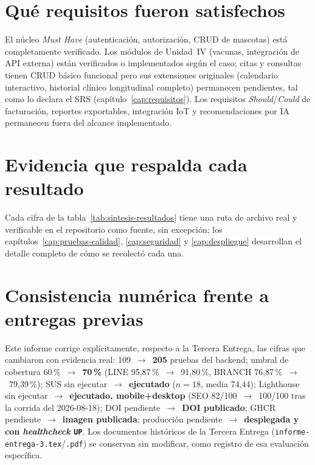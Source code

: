 \section{Qu\'e requisitos fueron satisfechos}

El n\'ucleo \emph{Must Have} (autenticaci\'on, autorizaci\'on, CRUD de
mascotas) est\'a completamente verificado. Los m\'odulos de Unidad~IV
(vacunas, integraci\'on de API externa) est\'an verificados o
implementados seg\'un el caso; citas y consultas tienen CRUD b\'asico
funcional pero sus extensiones originales (calendario interactivo,
historial cl\'inico longitudinal completo) permanecen pendientes, tal como
lo declara el SRS (cap\'itulo~\ref{cap:requisitos}). Los requisitos
\emph{Should}/\emph{Could} de facturaci\'on, reportes exportables,
integraci\'on IoT y recomendaciones por IA permanecen fuera del alcance
implementado.

\section{Evidencia que respalda cada resultado}

Cada cifra de la tabla~\ref{tab:sintesis-resultados} tiene una ruta de
archivo real y verificable en el repositorio como fuente, sin excepci\'on;
los cap\'itulos~\ref{cap:pruebas-calidad}, \ref{cap:seguridad} y
\ref{cap:despliegue} desarrollan el detalle completo de c\'omo se
recolect\'o cada una.

\section{Consistencia num\'erica frente a entregas previas}

Este informe corrige expl\'icitamente, respecto a la Tercera Entrega,
las cifras que cambiaron con evidencia real: 109~$\to$~\textbf{205} pruebas
del backend; umbral de cobertura 60\,\%~$\to$~\textbf{70\,\%} (LINE
95{,}87\,\%~$\to$~91{,}80\,\%, BRANCH 76{,}87\,\%~$\to$~79{,}39\,\%); SUS
sin ejecutar~$\to$~\textbf{ejecutado} ($n=18$, media 74{,}44); Lighthouse
sin ejecutar~$\to$~\textbf{ejecutado, mobile+desktop} (SEO
82/100~$\to$~100/100 tras la corrida del 2026-08-18); DOI pendiente~$\to$~\textbf{DOI publicado}; GHCR
pendiente~$\to$~\textbf{imagen publicada}; producci\'on pendiente~$\to$~\textbf{desplegada
y con \emph{healthcheck} \texttt{UP}}. Los documentos hist\'oricos de la
Tercera Entrega (\texttt{informe-entrega-3.tex}/\texttt{.pdf}) se conservan
sin modificar, como registro de esa evaluaci\'on espec\'ifica.

